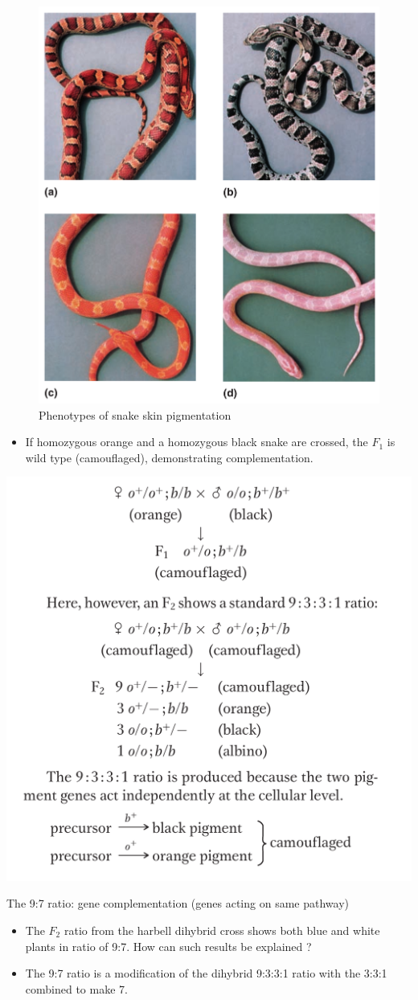 \documentclass[11pt,dvipsnames,ignorenonframetext,aspectratio=169]{beamer}
\providecommand{\tightlist}{%
  \setlength{\itemsep}{0pt}\setlength{\parskip}{0pt}}
\begin{document}
\begin{frame}{}
\protect\hypertarget{section-13}{}
\begin{figure}

{\centering \includegraphics[width=0.42\linewidth]{./../images/gene_no_interaction} 

}

\caption{Phenotypes of snake skin pigmentation}\label{fig:gene-no-interaction1}
\end{figure}
\end{frame}

\begin{frame}{}
\protect\hypertarget{section-14}{}
\begin{itemize}
\tightlist
\item
  If homozygous orange and a homozygous black snake are crossed, the
  \(F_1\) is wild type (camouflaged), demonstrating complementation.
\end{itemize}

\begin{center}\includegraphics[width=0.4\linewidth]{./../images/gene_no_interaction2} \end{center}
\end{frame}

\begin{frame}{The 9:7 ratio: gene complementation (genes acting on same
pathway)}
\protect\hypertarget{the-97-ratio-gene-complementation-genes-acting-on-same-pathway}{}
\begin{itemize}
\tightlist
\item
  The \(F_2\) ratio from the harbell dihybrid cross shows both blue and
  white plants in ratio of 9:7. How can such results be explained ?
\item
  The 9:7 ratio is a modification of the dihybrid 9:3:3:1 ratio with the
  3:3:1 combined to make 7.
\end{itemize}
\end{frame}
\end{document}
